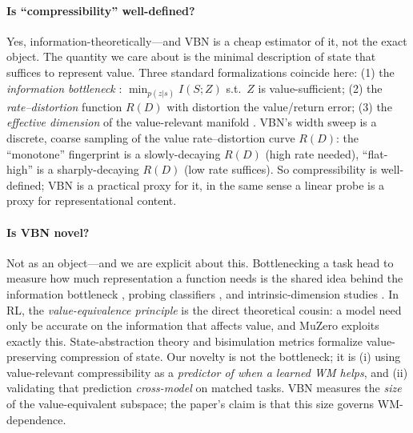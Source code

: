 \documentclass[twocolumn,10pt]{article}
\begin{document}
\paragraph{Is ``compressibility'' well-defined?}
Yes, information-theoretically---and VBN is a cheap estimator of it, not the
exact object. The quantity we care about is the minimal description of state
that suffices to represent value. Three standard formalizations coincide here:
(1) the \emph{information bottleneck} \cite{tishby1999ib,tishby2015dl}:
$\min_{p(z|s)} I(S;Z)$ s.t.\ $Z$ is value-sufficient; (2) the
\emph{rate--distortion} function $R(D)$ with distortion the value/return
error; (3) the \emph{effective dimension} of the value-relevant manifold
\cite{li2018intrinsic}. VBN's width sweep is a discrete, coarse sampling of
the value rate--distortion curve $R(D)$: the ``monotone'' fingerprint is a
slowly-decaying $R(D)$ (high rate needed), ``flat-high'' is a sharply-decaying
$R(D)$ (low rate suffices). So compressibility is well-defined; VBN is a
practical proxy for it, in the same sense a linear probe
\cite{alain2016probes} is a proxy for representational content.

\paragraph{Is VBN novel?}
Not as an object---and we are explicit about this. Bottlenecking a task head
to measure how much representation a function needs is the shared idea behind
the information bottleneck \cite{tishby1999ib}, probing classifiers
\cite{alain2016probes}, and intrinsic-dimension studies
\cite{li2018intrinsic}. In RL, the \emph{value-equivalence principle}
\cite{grimm2020value} is the direct theoretical cousin: a model need only be
accurate on the information that affects value, and MuZero
\cite{schrittwieser2020muzero} exploits exactly this. State-abstraction theory
\cite{li2006abstraction} and bisimulation metrics \cite{zhang2021dbc} formalize
value-preserving compression of state. Our novelty is not the bottleneck; it
is (i) using value-relevant compressibility as a \emph{predictor of when a
learned WM helps}, and (ii) validating that prediction \emph{cross-model} on
matched tasks. VBN measures the \emph{size} of the value-equivalent subspace;
the paper's claim is that this size governs WM-dependence.
\end{document}

